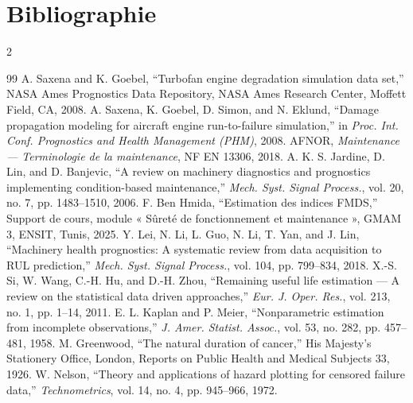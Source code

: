 
\chapter*{Bibliographie}
\begin{multicols}{2}
\small{}\sloppy
\begingroup
\renewcommand{\chapter}[2]{}%
\begin{thebibliography}{99}
\setlength{\itemsep}{2pt}
 A. Saxena and K. Goebel, ``Turbofan engine degradation simulation data set,'' NASA Ames Prognostics Data Repository, NASA Ames Research Center, Moffett Field, CA, 2008.
 A. Saxena, K. Goebel, D. Simon, and N. Eklund, ``Damage propagation modeling for aircraft engine run-to-failure simulation,'' in \emph{Proc. Int. Conf. Prognostics and Health Management (PHM)}, 2008.
 AFNOR, \emph{Maintenance — Terminologie de la maintenance}, NF EN 13306, 2018.
 A. K. S. Jardine, D. Lin, and D. Banjevic, ``A review on machinery diagnostics and prognostics implementing condition-based maintenance,'' \emph{Mech. Syst. Signal Process.}, vol. 20, no. 7, pp. 1483–1510, 2006.
 F. Ben Hmida, ``Estimation des indices FMDS,'' Support de cours, module « Sûreté de fonctionnement et maintenance », GMAM 3, ENSIT, Tunis, 2025.
 Y. Lei, N. Li, L. Guo, N. Li, T. Yan, and J. Lin, ``Machinery health prognostics: A systematic review from data acquisition to RUL prediction,'' \emph{Mech. Syst. Signal Process.}, vol. 104, pp. 799–834, 2018.
 X.-S. Si, W. Wang, C.-H. Hu, and D.-H. Zhou, ``Remaining useful life estimation — A review on the statistical data driven approaches,'' \emph{Eur. J. Oper. Res.}, vol. 213, no. 1, pp. 1–14, 2011.
 E. L. Kaplan and P. Meier, ``Nonparametric estimation from incomplete observations,'' \emph{J. Amer. Statist. Assoc.}, vol. 53, no. 282, pp. 457–481, 1958.
 M. Greenwood, ``The natural duration of cancer,'' His Majesty's Stationery Office, London, Reports on Public Health and Medical Subjects 33, 1926.
 W. Nelson, ``Theory and applications of hazard plotting for censored failure data,'' \emph{Technometrics}, vol. 14, no. 4, pp. 945–966, 1972.

\end{thebibliography}
\end{multicols}
